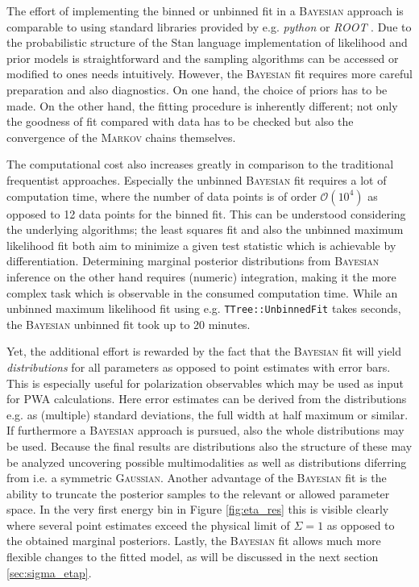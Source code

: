 The effort of implementing the binned or unbinned fit in a \textsc{Bayesian} approach is comparable to using standard libraries provided by e.g. \emph{python} \cite{python} or \emph{ROOT} \cite{root}. Due to the probabilistic structure of the Stan language \cite{stan} implementation of likelihood and prior models is straightforward and the sampling algorithms can be accessed or modified to ones needs intuitively. However, the \textsc{Bayesian} fit requires more careful preparation and also diagnostics. On one hand, the choice of priors has to be made. On the other hand, the fitting procedure is inherently different; not only the goodness of fit compared with data has to be checked but also the convergence of the \textsc{Markov} chains themselves. 

The computational cost also increases greatly in comparison to the traditional frequentist approaches. Especially the unbinned \textsc{Bayesian} fit requires a lot of computation time,  where the number of data points is of order $\mathcal{O}(10^4)$ as opposed to 12 data points for the binned fit. This can be understood considering the underlying algorithms; the least squares fit and also the unbinned maximum likelihood fit both aim to minimize a given test statistic which is achievable by differentiation. Determining marginal posterior distributions from \textsc{Bayesian} inference on the other hand requires (numeric) integration, making it the more complex task which is observable in the consumed computation time. While an unbinned maximum likelihood fit using e.g. \texttt{TTree::UnbinnedFit} \cite{runbinnedFit} takes seconds, the \textsc{Bayesian} unbinned fit took up to 20 minutes. 

Yet, the additional effort is rewarded by the fact that the \textsc{Bayesian} fit will yield \emph{distributions} for all parameters as opposed to point estimates with error bars. This is especially useful for polarization observables which may be used as input for PWA calculations. Here error estimates can be derived from the distributions e.g. as (multiple) standard deviations, the full width at half maximum or similar. If furthermore a \textsc{Bayesian} approach is  pursued, also the whole distributions may be used. Because the final results are distributions also the structure of these may be analyzed uncovering possible multimodalities as well as distributions diferring from i.e. a symmetric \textsc{Gaussian}. Another advantage of the \textsc{Bayesian} fit is the ability to truncate the posterior samples to the relevant or allowed parameter space. In the very first energy bin in Figure \ref{fig:eta_res} this is visible clearly where several point estimates exceed the physical limit of $\Sigma=1$ as opposed to the obtained marginal posteriors. Lastly, the \textsc{Bayesian} fit allows much more flexible changes to the fitted model, as will be discussed in the next section \ref{sec:sigma_etap}.


